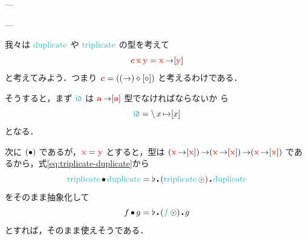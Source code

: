 \documentclass[a5paper,twoside,fleqn,draft]{jsbook}
\begin{document}
---

---

我々は $\mDuplicate$ や $\mTriplicate$ の型を考えて
\begin{equation}
  \mTypeConstructor{c}\,\mX\,\mY
  =\mX\hFunctionArrow[\mY]
\end{equation}
と考えてみよう．つまり
$\mTypeConstructor{c}=((\hFunctionArrow)\hAnonParam[\hAnonParam])$
と考えるわけである．

そうすると，まず $\mIdCat$ は $\hTypeName{a}\hFunctionArrow\hListConstruct{\hTypeName{a}}$ 型でなければならないか
ら
\begin{equation}
  \label{eq:id-category}
  \mIdCat
  =\mLambda x\mLambdaArrow[x]
\end{equation}
となる．

次に $(\operatorname{\bullet})$ であるが，$\mX=\mY$ とすると，型は
$(\mX\hFunctionArrow[\mX])\hFunctionArrow(\mX\hFunctionArrow[\mX])\hFunctionArrow(\mX\hFunctionArrow[\mX])$
であるから，式\eqref{eq:triplicate-duplicate}から
\begin{equation}
  \mTriplicate\mCompCat\mDuplicate
  =\mJoinList\hCompose{}(\mTriplicate\mMapList)\hCompose\mDuplicate
\end{equation}
をそのまま抽象化して
\begin{equation}
  \label{eq:triplicate-duplicate-comp}
  f\mCompCat g=\mJoinList\hCompose{}(\hFunc{f}\mMapList)\hCompose g
\end{equation}
とすれば，そのまま使えそうである．
\end{document}
